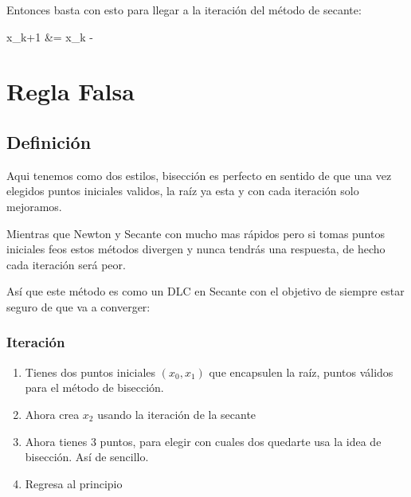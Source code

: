 \documentclass[12pt, fleqn]{report}                             %
\def \Eq {equation}                                             %
\newenvironment{MultiLineEquation*}[1]                          %
        {\begin{\Eq*}\begin{alignedat}{#1}}                         %
        {\end{alignedat}\end{\Eq*}}                                 %
\newenvironment{LargeEq} {\begingroup \Large}{\endgroup}        %
\newcommand \Quote              {\qq}                           %
\theoremstyle{break}                                            %
\newcommand{\Wrap}[1]           {\left( #1 \right)}             %
\newcommand{\Color}[2]{\textcolor{#1}{#2}}                      %
\newcommand \ColorFun          {Teal700MD}                      %
\newcommand \ColorVarX         {Purple300MD}                    %
\newcommand \ColorVarXpu       {Purple700MD}                    %
\newcommand \ColorVarXmu       {Blue300MD}                      %
\newcommand \Fun[1]      {\Color{\ColorFun}{\pmb{f}\Wrap{#1}}}          %
\newcommand \VarX        {\Color{\ColorVarX}{x_k }}                     %
\newcommand \VarXpu      {\Color{\ColorVarXpu}{x_{k+1}  }}              %
\newcommand \VarXmu      {\Color{\ColorVarXmu}{x_{k-1}  }}              %
\begin{document}
            Entonces basta con esto para llegar a la iteración del método de secante:
            \begin{LargeEq}
                \begin{MultiLineEquation*}{3}
                    \VarXpu &= \VarX - \dfrac{\Fun{\VarX}(\VarX - \VarXmu)}{ \Fun{\VarX} - \Fun{\VarXmu} }     
                \end{MultiLineEquation*}
            \end{LargeEq}


    \chapter{Regla Falsa}

    \section{Definición}

        Aqui tenemos como dos estilos, bisección es perfecto en sentido de que una vez elegidos
        puntos iniciales validos, la raíz ya esta \Quote{encerrada} y con cada iteración solo mejoramos.

        Mientras que Newton y Secante con mucho mas rápidos pero si tomas puntos iniciales feos 
        estos métodos divergen y nunca tendrás una respuesta, de hecho cada iteración será peor.
        
        Así que este método es como un DLC en Secante con el objetivo de siempre estar seguro de
        que va a converger:

        \subsection{Iteración}

            \begin{enumerate}
                \item Tienes dos puntos iniciales $(x_0, x_1)$ que encapsulen la raíz, puntos válidos para 
                    el método de bisección. 
                \item Ahora crea $x_2$ usando la iteración de la secante
                \item Ahora tienes 3 puntos, para elegir con cuales dos quedarte usa la idea
                    de bisección. Así de sencillo.
                \item Regresa al principio
            \end{enumerate}
\end{document}
